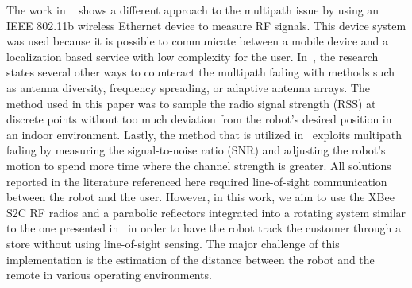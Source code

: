 \documentclass[conference]{IEEEtran}
\begin{document}
The work in ~\cite{ladd_bekris_rudys_kavraki_wallach_2005} shows a different
approach to the multipath issue by using an IEEE 802.11b wireless Ethernet
device to measure RF signals. This device system was used because it is possible to communicate between a mobile device and a localization based service with low
complexity for the user. In~\cite{lindhe_johansson_bicchi_2007}, the research
states several other ways to counteract the multipath fading with methods such
as antenna diversity, frequency spreading, or adaptive antenna arrays. The
method used in this paper was to sample the radio signal strength (RSS) at
discrete points without too much deviation from the robot's desired position in
an indoor environment. Lastly, the method that is utilized in~\cite{Lindhe2009}
exploits multipath fading by measuring the signal-to-noise ratio (SNR) and
adjusting the robot's motion to spend more time where the channel strength is
greater. All solutions reported in the literature referenced here required line-of-sight
communication between the robot and the user. However, in this work, we aim to use the
XBee S2C RF radios and a parabolic reflectors integrated into a rotating system
similar to the one presented in~\cite{Miah2018-Intelligent} in order to have the
robot track the customer through a store without using line-of-sight sensing.
The major challenge of this implementation is the estimation of the distance
between the robot and the remote in various operating environments.
\end{document}
